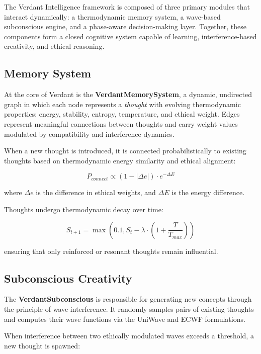 \documentclass{article}
\begin{document}
The Verdant Intelligence framework is composed of three primary modules that interact dynamically: a thermodynamic memory system, a wave-based subconscious engine, and a phase-aware decision-making layer. Together, these components form a closed cognitive system capable of learning, interference-based creativity, and ethical reasoning.

\subsection{Memory System}

At the core of Verdant is the \textbf{VerdantMemorySystem}, a dynamic, undirected graph in which each node represents a \textit{thought} with evolving thermodynamic properties: energy, stability, entropy, temperature, and ethical weight. Edges represent meaningful connections between thoughts and carry weight values modulated by compatibility and interference dynamics.

When a new thought is introduced, it is connected probabilistically to existing thoughts based on thermodynamic energy similarity and ethical alignment:

\begin{equation}
P_{connect} \propto (1 - |\Delta e|) \cdot e^{-\Delta E}
\end{equation}

\noindent where $\Delta e$ is the difference in ethical weights, and $\Delta E$ is the energy difference.

Thoughts undergo thermodynamic decay over time:

\begin{equation}
S_{t+1} = \max\left(0.1, S_t - \lambda \cdot \left(1 + \frac{T}{T_{max}}\right)\right)
\end{equation}

\noindent ensuring that only reinforced or resonant thoughts remain influential.

\subsection{Subconscious Creativity}

The \textbf{VerdantSubconscious} is responsible for generating new concepts through the principle of wave interference. It randomly samples pairs of existing thoughts and computes their wave functions via the UniWave and ECWF formulations.

When interference between two ethically modulated waves exceeds a threshold, a new thought is spawned:
\end{document}
